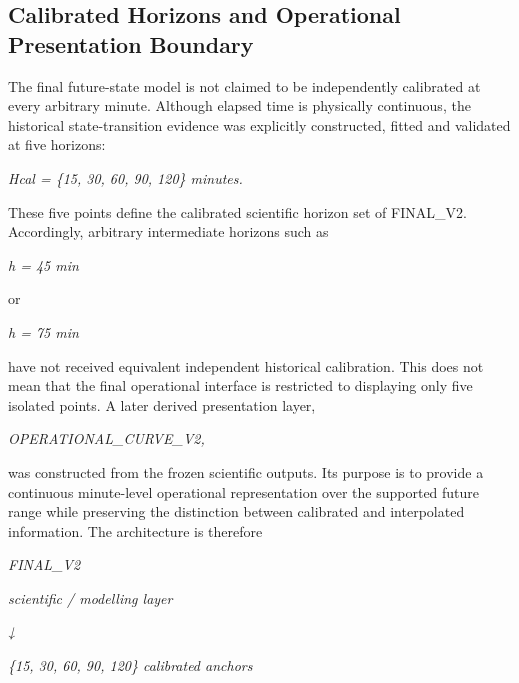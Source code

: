 \subsection{Calibrated Horizons and Operational Presentation Boundary}
The final future-state model is not claimed to be independently calibrated at every arbitrary minute. Although elapsed time is physically continuous, the historical state-transition evidence was explicitly constructed, fitted and validated at five horizons:

\begin{center}\textit{Hcal = \{15, 30, 60, 90, 120\} minutes.}\end{center}

These five points define the calibrated scientific horizon set of FINAL\_V2. Accordingly, arbitrary intermediate horizons such as

\begin{center}\textit{h = 45 min}\end{center}

or

\begin{center}\textit{h = 75 min}\end{center}

have not received equivalent independent historical calibration. This does not mean that the final operational interface is restricted to displaying only five isolated points. A later derived presentation layer,

\begin{center}\textit{OPERATIONAL\_CURVE\_V2,}\end{center}

was constructed from the frozen scientific outputs. Its purpose is to provide a continuous minute-level operational representation over the supported future range while preserving the distinction between calibrated and interpolated information. The architecture is therefore

\begin{center}\textit{FINAL\_V2}\end{center}

\begin{center}\textit{scientific / modelling layer}\end{center}

\begin{center}\textit{↓}\end{center}

\begin{center}\textit{\{15, 30, 60, 90, 120\} calibrated anchors}\end{center}

